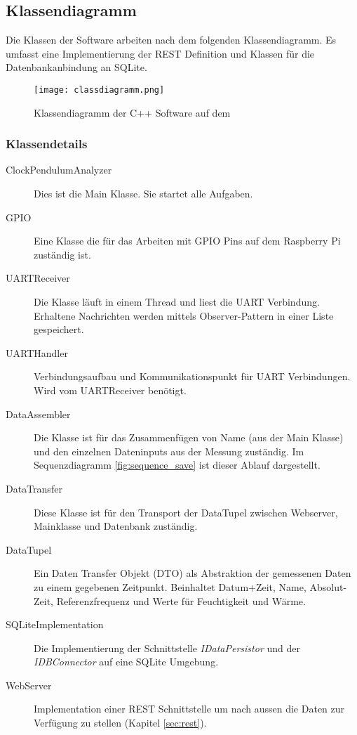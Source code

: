 \subsection{Klassendiagramm}
Die Klassen der Software arbeiten nach dem folgenden Klassendiagramm. Es umfasst eine Implementierung der REST Definition und Klassen für die Datenbankanbindung an SQLite.
\begin{figure}[H]
    \centering
    \texttt{[image: classdiagramm.png]}
    \caption{Klassendiagramm der C++ Software auf dem \rpi}
\end{figure}
\subsubsection{Klassendetails}
	\begin{description}
        \item[ClockPendulumAnalyzer] Dies ist die Main Klasse. Sie startet alle Aufgaben.
        \item[GPIO] Eine Klasse die für das Arbeiten mit GPIO Pins auf dem Raspberry Pi zuständig ist.
        \item[UARTReceiver] Die Klasse läuft in einem Thread und liest die UART Verbindung. Erhaltene Nachrichten werden mittels Observer-Pattern in einer Liste gespeichert.
        \item[UARTHandler] Verbindungsaufbau und Kommunikationspunkt für UART Verbindungen. Wird vom UARTReceiver benötigt.
        \item[DataAssembler] Die Klasse ist für das Zusammenfügen von Name (aus der Main Klasse) und den einzelnen Dateninputs aus der Messung zuständig. Im Sequenzdiagramm \ref{fig:sequence_save} ist dieser Ablauf dargestellt. 
        \item[DataTransfer] Diese Klasse ist für den Transport der DataTupel zwischen Webserver, Mainklasse und Datenbank zuständig.
        \item[DataTupel] Ein Daten Transfer Objekt (DTO) als Abstraktion der gemessenen Daten zu einem gegebenen Zeitpunkt. Beinhaltet Datum+Zeit, Name, Absolut-Zeit, Referenzfrequenz und Werte für Feuchtigkeit und Wärme.
        \item[SQLiteImplementation] Die Implementierung der Schnittstelle \textit{IDataPersistor} und der \textit{IDBConnector} auf eine SQLite Umgebung.
        \item[WebServer] Implementation einer REST Schnittstelle um nach aussen die Daten zur Verfügung zu stellen (Kapitel \ref{sec:rest}).
    \end{description}
